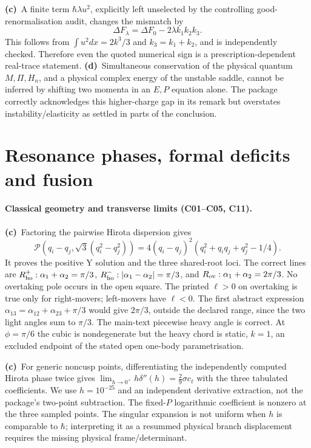 \documentclass[11pt,a4paper]{article}
\newcommand{\Lc}{\textbf{(c)}\ }
\newcommand{\Ld}{\textbf{(d)}\ }
\begin{document}
\Lc A finite term $\hbar\lambda u^2$, explicitly left unselected by the
controlling good-renormalisation audit, changes the mismatch by
\begin{equation}
 \Delta F_\lambda=\Delta F_0-2\lambda k_1k_2k_3.
\end{equation}
This follows from $\int u^2dx=2k^3/3$ and $k_3=k_1+k_2$, and is independently
checked. Therefore even the quoted numerical sign is a prescription-dependent
real-trace statement. \Ld Simultaneous conservation of the physical quantum
$M,\Pi,H_n$, and a physical complex energy of the unstable saddle, cannot be
inferred by shifting two momenta in an $E,P$ equation alone. The package
correctly acknowledges this higher-charge gap in its remark but overstates
instability/elasticity as settled in parts of the conclusion.

\section{Resonance phases, formal deficits and fusion}
\paragraph{Classical geometry and transverse limits (C01--C05, C11).}
\Lc Factoring the pairwise Hirota dispersion gives
\[
 \mathcal P(q_i-q_j,\sqrt3(q_i^2-q_j^2))
 =4(q_i-q_j)^2(q_i^2+q_iq_j+q_j^2-1/4).
\]
It proves the positive Y solution and the three shared-root loci. The correct
lines are $R_{\rm ho}^+:\alpha_1+\alpha_2=\pi/3$,
$R_{\rm ho}^-:|\alpha_1-\alpha_2|=\pi/3$, and
$R_{\rm ov}:\alpha_1+\alpha_2=2\pi/3$. No overtaking pole occurs in the open
square. The printed $\ell>0$ on overtaking is true only for right-movers;
left-movers have $\ell<0$. The first abstract expression
$\alpha_{13}=\alpha_{12}+\alpha_{23}+\pi/3$ would give $2\pi/3$,
outside the declared range, since the two light angles sum to $\pi/3$.
The main-text piecewise heavy angle is correct. At $\phi=\pi/6$ the cubic
is nondegenerate but the heavy chord is static, $k=1$, an excluded endpoint
of the stated open one-body parametrisation.

\Lc For generic noncusp points, differentiating the independently computed
Hirota phase twice gives
$\lim_{h\to0^+}h\delta''(h)=\frac29\sigma c_\ell$ with the three tabulated
coefficients. We use $h=10^{-25}$ and an independent derivative extraction,
not the package's two-point subtraction. The fixed-$P$ logarithmic coefficient
is nonzero at the three sampled points. The singular expansion is not uniform
when $h$ is comparable to $\hbar$; interpreting it as a resummed physical
branch displacement requires the missing physical frame/determinant.
\end{document}
